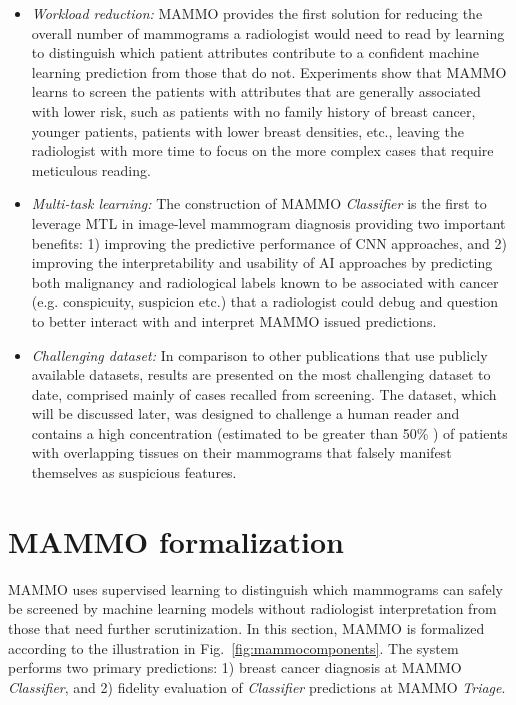 \documentclass[journal]{IEEEtran}
\begin{document}
\begin{itemize}
    \item \textit{Workload reduction:} MAMMO provides the first solution for reducing the overall number of mammograms a radiologist would need to read by learning to distinguish which patient attributes contribute to a confident machine learning prediction from those that do not.  Experiments show that MAMMO learns to screen the patients with attributes that are generally associated with lower risk, such as patients with no family history of breast cancer, younger patients, patients with lower breast densities, etc., leaving the radiologist with more time to focus on the more complex cases that require meticulous reading.  
    \item \textit{Multi-task learning:} The construction of MAMMO \textit{Classifier} is the first to leverage MTL in image-level mammogram diagnosis providing two important benefits: 1) improving the predictive performance of CNN approaches, and 2) improving the interpretability and usability of AI approaches by predicting both malignancy and radiological labels known to be associated with cancer (e.g. conspicuity, suspicion etc.) that a radiologist could debug and question to better interact with and interpret MAMMO issued predictions.
    
    \item \textit{Challenging dataset:} In comparison to other publications that use publicly available datasets, results are presented on the most challenging dataset to date, comprised mainly of cases recalled from screening.  The dataset, which will be discussed later, was designed to challenge a human reader and contains a high concentration (estimated to be greater than 50\% \cite{tommy-2015}) of patients with overlapping tissues on their mammograms that falsely manifest themselves as suspicious features.  

\end{itemize}


 


\section{MAMMO formalization} 

MAMMO uses supervised learning to distinguish which mammograms can safely be screened by machine learning models without radiologist interpretation from those that need further scrutinization.  In this section, MAMMO is formalized according to the illustration in Fig.~\ref{fig:mammocomponents}. The system performs two primary predictions: 1) breast cancer diagnosis at MAMMO \textit{Classifier}, and 2)  fidelity evaluation of \textit{Classifier} predictions at MAMMO \textit{Triage}.
\end{document}
